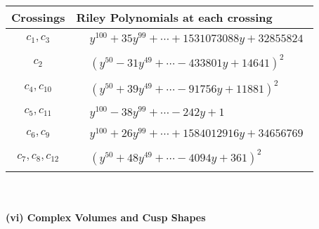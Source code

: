 \documentclass[1p]{elsarticle_modified}
\theoremstyle{definition}
\begin{document}
\begin{tabular}{m{50pt}|m{274pt}}
Crossings & \hspace{64pt}Riley Polynomials at each crossing \\
\hline $$\begin{aligned}c_{1},c_{3}\end{aligned}$$&$\begin{aligned}
&y^{100}+35 y^{99}+\cdots+1531073088 y+32855824
\end{aligned}$\\
\hline $$\begin{aligned}c_{2}\end{aligned}$$&$\begin{aligned}
&(y^{50}-31 y^{49}+\cdots-433801 y+14641)^{2}
\end{aligned}$\\
\hline $$\begin{aligned}c_{4},c_{10}\end{aligned}$$&$\begin{aligned}
&(y^{50}+39 y^{49}+\cdots-91756 y+11881)^{2}
\end{aligned}$\\
\hline $$\begin{aligned}c_{5},c_{11}\end{aligned}$$&$\begin{aligned}
&y^{100}-38 y^{99}+\cdots-242 y+1
\end{aligned}$\\
\hline $$\begin{aligned}c_{6},c_{9}\end{aligned}$$&$\begin{aligned}
&y^{100}+26 y^{99}+\cdots+1584012916 y+34656769
\end{aligned}$\\
\hline $$\begin{aligned}c_{7},c_{8},c_{12}\end{aligned}$$&$\begin{aligned}
&(y^{50}+48 y^{49}+\cdots-4094 y+361)^{2}
\end{aligned}$\\
\hline
\end{tabular}\\~\\
\newpage\flushleft \textbf{(vi) Complex Volumes and Cusp Shapes}
\end{document}
